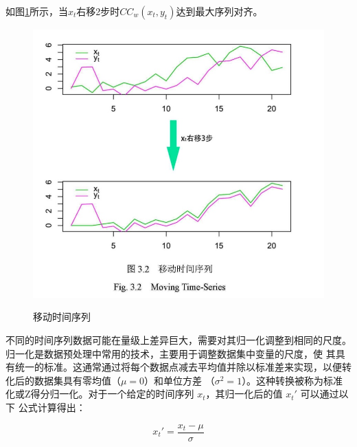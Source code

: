 如图\ref{fig:NCC}所示，当$x_t$右移2步时\( CC_w(x_t, y_t) \)达到最大序列对齐。
\begin{figure}[H]
    \centering
    \includegraphics[scale=0.3,angle=0]{figure/NCC.jpg}\\
    \caption{移动时间序列}
    \label{fig:NCC}
\end{figure}
不同的时间序列数据可能在量级上差异巨大，需要对其归一化调整到相同的尺度。归一化是数据预处理中常用的技术，主要用于调整数据集中变量的尺度，使
其具有统一的标准。这通常通过将每个数据点减去平均值并除以标准差来实现，以便转化后的数据集具有零均值（\( \mu = 0 \)）和单位方差
（\( \sigma^2 = 1 \)）。这种转换被称为标准化或Z得分归一化。对于一个给定的时间序列 \( x_t \)，其归一化后的值 \( x_t' \) 可以通过以下
公式计算得出：

\begin{equation}
x_t' = \frac{x_t - \mu}{\sigma}
\label{eq:normal1}
\end{equation}

